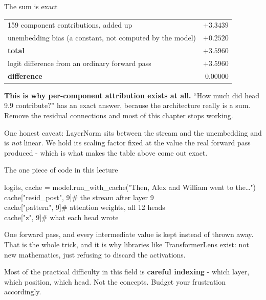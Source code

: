 \documentclass[aspectratio=169]{beamer}
\newcommand{\takebox}[1]{%
  \begin{tcolorbox}[colback=paramgreen!8, colframe=paramgreen, boxrule=0.6pt, arc=2pt]
  #1
  \end{tcolorbox}}
\newcommand{\watchbox}[1]{%
  \begin{tcolorbox}[colback=armorange!12, colframe=armorange, boxrule=0.6pt, arc=2pt]
  #1
  \end{tcolorbox}}
\newcommand{\codebox}[1]{%
  \begin{center}
  \begin{tcolorbox}[colback=lightbg, colframe=gray, boxrule=0.5pt, arc=2pt,
                    width=0.94\textwidth, left=4pt, right=4pt, top=3pt, bottom=3pt]
    \ttfamily\scriptsize #1
  \end{tcolorbox}
  \end{center}}
\begin{document}
\begin{frame}{The sum is exact}
  \vspace{0.8em}
  \begin{center}
  \small
  \begin{tabular}{@{}lr@{}}
    \toprule
    159 component contributions, added up & $+3.3439$\\
    unembedding bias (a constant, not computed by the model) & $+0.2520$\\
    \midrule
    \textbf{total} & $\mathbf{+3.5960}$\\
    logit difference from an ordinary forward pass & $+3.5960$\\
    \midrule
    \textbf{difference} & $\mathbf{0.00000}$\\
    \bottomrule
  \end{tabular}
  \end{center}

  \vspace{1.0em}
  \takebox{\textbf{This is why per-component attribution exists at all.} ``How much did head
  9.9 contribute?'' has an exact answer, because the architecture really is a sum. Remove the
  residual connections and most of this chapter stops working.}

  \vspace{0.6em}
  {\footnotesize One honest caveat: LayerNorm sits between the stream and the unembedding and
  is \emph{not} linear. We hold its scaling factor fixed at the value the real forward pass
  produced - which is what makes the table above come out exact.}
\end{frame}

\begin{frame}{The one piece of code in this lecture}
  \vspace{0.6em}
  \codebox{%
    logits, cache = model.run\_with\_cache("Then, Alex and William went to the\ldots")\\[0.4em]
    cache["resid\_post", 9]\hspace{2.6em}\# the stream after layer 9\\
    cache["pattern", 9]\hspace{3.9em}\# attention weights, all 12 heads\\
    cache["z", 9]\hspace{5.5em}\# what each head wrote
  }

  \vspace{0.5em}
  One forward pass, and every intermediate value is kept instead of thrown away. That is the
  whole trick, and it is why libraries like TransformerLens exist: not new mathematics, just
  refusing to discard the activations.

  \vspace{0.8em}
  \watchbox{Most of the practical difficulty in this field is \textbf{careful indexing} - which
  layer, which position, which head. Not the concepts. Budget your frustration accordingly.}
\end{frame}
\end{document}
